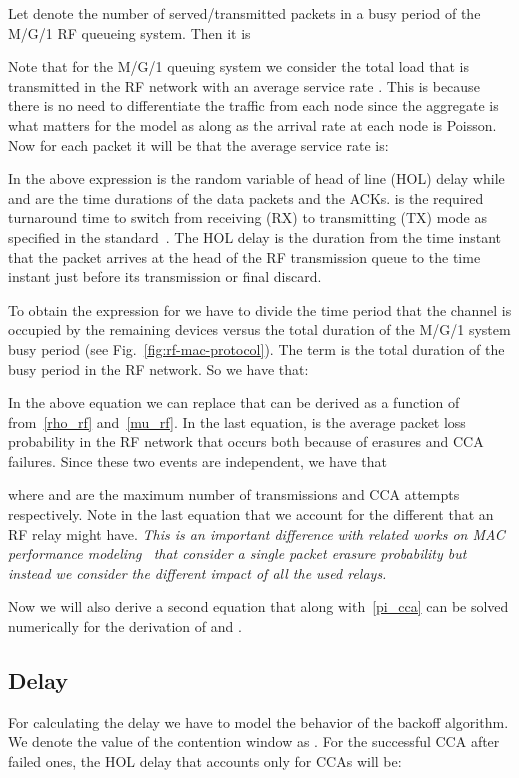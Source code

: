 \documentclass[10pt]{IEEEtran}
\newcounter{section:outage-analysis}
\begin{document}
Let  denote the number of served/transmitted packets in a busy period of the M/G/1 RF queueing system. Then it is

Note that for the M/G/1 queuing system we consider the total load that is transmitted in the RF network with an average service rate . This is because there is no need to differentiate the traffic from each node since the aggregate is what matters for the model as along as the arrival rate at each node is Poisson. Now for each packet it will be that the average service rate is:

In the above expression  is the random variable of head of line (HOL) delay while  and  are the time durations of the data packets and the ACKs.  is the required turnaround time to switch from receiving (RX) to transmitting (TX) mode as specified in the standard~\cite{IEEE-802154}. The HOL delay is the duration from the time instant that the packet arrives at the head of the RF transmission queue to the time instant just before its transmission or final discard.

To obtain the expression for  we have to divide the time period that the channel is occupied by the remaining  devices versus the total duration of the M/G/1 system busy period (see Fig.~\ref{fig:rf-mac-protocol}). The term  is the total duration of the busy period in the RF network. So we have that:

In the above equation we can replace  that can be derived as a function of  from~\eqref{rho_rf} and~\eqref{mu_rf}. In the last equation,  is the average packet loss probability in the RF network that occurs both because of erasures and CCA failures. Since these two events are independent, we have that

where  and  are the maximum number of transmissions and CCA attempts respectively. Note in the last equation that we account for the different  that an RF relay might have. \textit{This is an important difference with related works on MAC performance modeling~\cite{kim2008:performance-802154,bianchi-80211,wu02,Miluzzo08radiocharacterization} that consider a single packet erasure probability but instead we consider the different impact of all the used relays.}

Now we will also derive a second equation that along with~\eqref{pi_cca} can be solved numerically for the derivation of  and .


\subsection{Delay}
For calculating the delay  we have to model the behavior of the backoff algorithm. We denote the value of the contention window as . For the successful CCA after  failed ones, the HOL delay that accounts only for CCAs will be:
\end{document}
